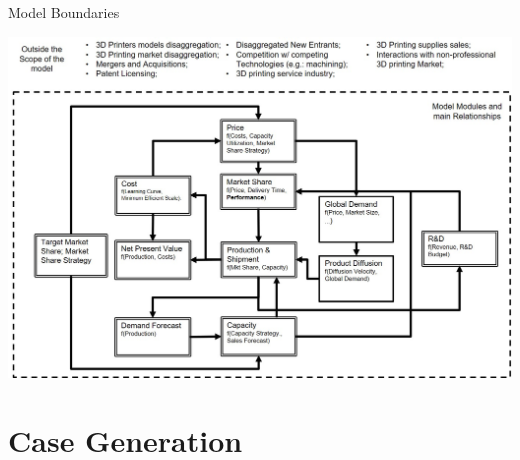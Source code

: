 \documentclass[12pt,ignorenonframetext,]{beamer}
\begin{document}
\begin{frame}{Model Boundaries}

\includegraphics{images/model-modules-and-boundaries.jpg}

\end{frame}

\section{Case Generation}\label{case-generation}
\end{document}
